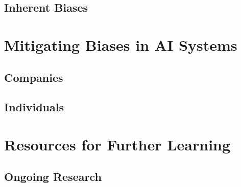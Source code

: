 \documentclass[
]{book}
\begin{document}
\hypertarget{inherent-biases}{%
\section{Inherent Biases}\label{inherent-biases}}

\hypertarget{mitigating-biases-in-ai-systems}{%
\chapter{Mitigating Biases in AI Systems}\label{mitigating-biases-in-ai-systems}}

\hypertarget{companies}{%
\section{Companies}\label{companies}}

\hypertarget{individuals}{%
\section{Individuals}\label{individuals}}

\hypertarget{resources-for-further-learning}{%
\chapter{Resources for Further Learning}\label{resources-for-further-learning}}

\hypertarget{ongoing-research}{%
\section{Ongoing Research}\label{ongoing-research}}
\end{document}
